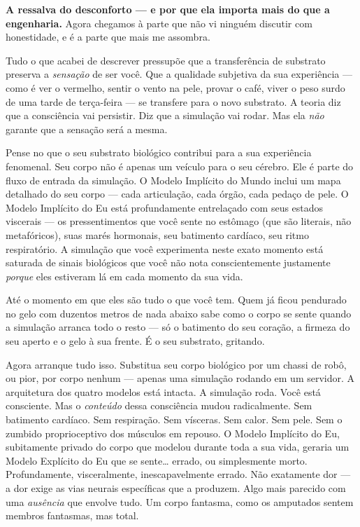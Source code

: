 \documentclass[11pt, twoside, openright]{book}
\begin{document}
\textbf{A ressalva do desconforto --- e por que ela importa mais do que a engenharia.} Agora chegamos à parte que não vi ninguém discutir com honestidade, e é a parte que mais me assombra.

Tudo o que acabei de descrever pressupõe que a transferência de substrato preserva a \textit{sensação} de ser você. Que a qualidade subjetiva da sua experiência --- como é ver o vermelho, sentir o vento na pele, provar o café, viver o peso surdo de uma tarde de terça-feira --- se transfere para o novo substrato. A teoria diz que a consciência vai persistir. Diz que a simulação vai rodar. Mas ela \textit{não} garante que a sensação será a mesma.

Pense no que o seu substrato biológico contribui para a sua experiência fenomenal. Seu corpo não é apenas um veículo para o seu cérebro. Ele é parte do fluxo de entrada da simulação. O Modelo Implícito do Mundo inclui um mapa detalhado do seu corpo --- cada articulação, cada órgão, cada pedaço de pele. O Modelo Implícito do Eu está profundamente entrelaçado com seus estados viscerais --- os pressentimentos que você sente no estômago (que são literais, não metafóricos), suas marés hormonais, seu batimento cardíaco, seu ritmo respiratório. A simulação que você experimenta neste exato momento está saturada de sinais biológicos que você não nota conscientemente justamente \textit{porque} eles estiveram lá em cada momento da sua vida.

Até o momento em que eles são tudo o que você tem. Quem já ficou pendurado no gelo com duzentos metros de nada abaixo sabe como o corpo se sente quando a simulação arranca todo o resto --- só o batimento do seu coração, a firmeza do seu aperto e o gelo à sua frente. É o seu substrato, gritando.

Agora arranque tudo isso. Substitua seu corpo biológico por um chassi de robô, ou pior, por corpo nenhum --- apenas uma simulação rodando em um servidor. A arquitetura dos quatro modelos está intacta. A simulação roda. Você está consciente. Mas o \textit{conteúdo} dessa consciência mudou radicalmente. Sem batimento cardíaco. Sem respiração. Sem vísceras. Sem calor. Sem pele. Sem o zumbido proprioceptivo dos músculos em repouso. O Modelo Implícito do Eu, subitamente privado do corpo que modelou durante toda a sua vida, geraria um Modelo Explícito do Eu que se sente\ldots{} errado, ou simplesmente morto. Profundamente, visceralmente, inescapavelmente errado. Não exatamente dor --- a dor exige as vias neurais específicas que a produzem. Algo mais parecido com uma \textit{ausência} que envolve tudo. Um corpo fantasma, como os amputados sentem membros fantasmas, mas total.
\end{document}
